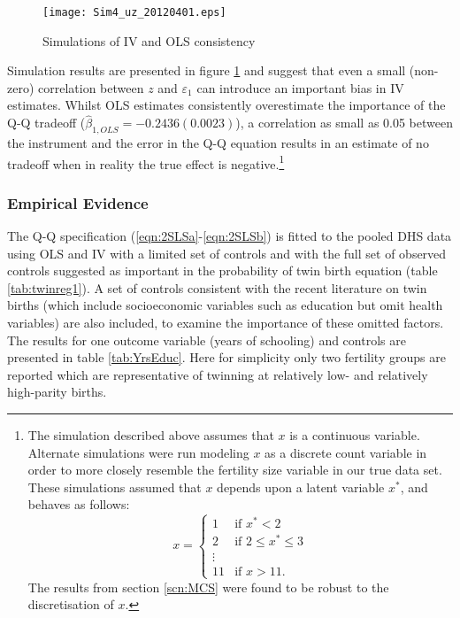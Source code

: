\documentclass{article}[11pt,subeqn]
\begin{document}
\begin{spacing}{1.5}
\begin{figure}[!htbp]
\caption{Simulations of IV and OLS consistency}
\label{fig:MC}
\begin{center}
\vspace{-4mm}
\texttt{[image: Sim4\_uz\_20120401.eps]}
\end{center}
\end{figure}


Simulation results are presented in figure \ref{fig:MC} and suggest that even a small (non-zero) correlation between $z$ and $\varepsilon_1$ can introduce an 
important bias in IV estimates.  Whilst OLS estimates consistently overestimate the importance of the Q-Q tradeoff ($\hat{\beta}_{1,OLS}=-0.2436 (0.0023)$), a correlation
as small as 0.05 between the instrument and the error in the Q-Q equation results in an estimate of no tradeoff when in reality the true effect is negative.\footnote{The
simulation described above assumes that $x$ is a continuous variable.  Alternate simulations were run modeling $x$ as a discrete count variable in order to more closely resemble the fertility size variable in our true data set.  These simulations assumed that $x$ depends upon a latent variable $x^*$, and behaves as follows:
\[ x = \left\{ \begin{array}{ll}
         1 & \mbox{if $x^* < 2$}\\
         2 & \mbox{if $2\leq x^* \leq 3$}\\
        \vdots & \\
        11 & \mbox{if $x > 11$}.\end{array} \right. \]
 The results from section \ref{scn:MCS} were found to be robust to the discretisation of $x$.
}
\vspace{-5mm}
\subsubsection{Empirical Evidence}
\label{scn:EE}
\vspace{-5mm}
The Q-Q specification (\ref{eqn:2SLSa}-\ref{eqn:2SLSb}) is fitted to the pooled DHS data using OLS and IV with a limited set of controls and with the full set of observed 
controls suggested as important in the probability of twin birth equation (table \ref{tab:twinreg1}).  A set of controls consistent with the recent literature on twin births (which 
include socioeconomic variables such as education but omit health variables) are also included, to examine the importance of these omitted factors.  The results for one outcome variable (years of schooling) and controls are presented in table \ref{tab:YrsEduc}.  Here for simplicity only two fertility groups are reported which are representative
of twinning at relatively low- and relatively high-parity births.



\end{spacing}
\end{document}
